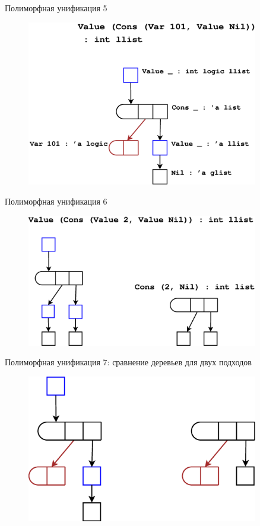 \documentclass[10pt, mathserif]{beamer}
\theoremstyle{definition}
\begin{document}
\begin{frame}[fragile]{Полиморфная унификация 5}

\begin{figure}
\centering
\includegraphics[width=0.9\textwidth]{img3.eps}
\end{figure}

\end{frame}

\begin{frame}[fragile]{Полиморфная унификация 6}
\begin{figure}
\centering
\includegraphics[width=0.9\textwidth]{img4.eps}
\end{figure}
\end{frame}

\begin{frame}[fragile]{Полиморфная унификация 7: сравнение деревьев для двух подходов}
\begin{figure}
\centering
\includegraphics[width=0.9\textwidth]{img5.eps}
\end{figure}
\end{frame}
\end{document}
